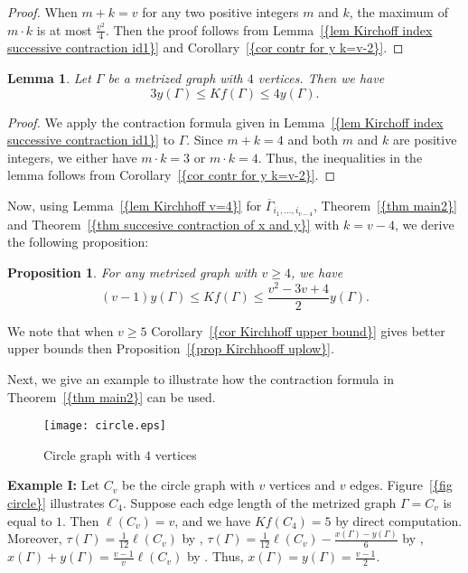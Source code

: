 \documentclass[12pt]{amsart}
\newtheorem{lemma}[theorem]{Lemma}
\newtheorem{proposition}[theorem]{Proposition}
\theoremstyle{example}
\theoremstyle{definition}
\theoremstyle{notation}
\begin{document}
\begin{proof}
When $m+k=v$ for any two positive integers $m$ and $k$, the maximum of $m \cdot k$ is at most $\frac{v^2}{4}$.
Then the proof follows from {Lemma~\ref{{lem Kirchoff index successive contraction id1}}} and {Corollary~\ref{{cor contr for y k=v-2}}}.
\end{proof}
\begin{lemma}\label{lem Kirchhoff v=4}
Let ${\Gamma}$ be a metrized graph with $4$ vertices. Then we have
$$3y({\Gamma}) \leq  Kf({\Gamma}) \leq 4  y({\Gamma}).$$
\end{lemma}
\begin{proof}
We apply the contraction formula given in {Lemma~\ref{{lem Kirchoff index successive contraction id1}}} to ${\Gamma}$.
Since $m+k=4$ and both $m$ and $k$ are positive integers, we either have $m \cdot k =3$ or $m \cdot k =4$.
Thus, the inequalities in the lemma follows from {Corollary~\ref{{cor contr for y k=v-2}}}.
\end{proof}
Now, using {Lemma~\ref{{lem Kirchhoff v=4}}} for ${{\overline{\Gamma}}}_{i_1,\dots, i_{v-4}}$, {Theorem~\ref{{thm main2}}} and {Theorem~\ref{{thm succesive contraction of x and y}}} with $k=v-4$, we derive the following proposition:
\begin{proposition}\label{prop Kirchhooff uplow}
For any metrized graph with $v \geq 4$, we have
$$ (v-1)y({\Gamma}) \leq  Kf({\Gamma}) \leq \frac{v^2-3v+4}{2}  y({\Gamma}).$$
\end{proposition}
We note that when $v \geq 5$ {Corollary~\ref{{cor Kirchhoff upper bound}}} gives better upper bounds then {Proposition~\ref{{prop Kirchhooff uplow}}}.

Next, we give an example to illustrate how the contraction formula in {Theorem~\ref{{thm main2}}} can be used.
\begin{figure}
\centering
\texttt{[image: circle.eps]} \caption{Circle graph with $4$ vertices} \label{fig circle}
\end{figure}

\textbf{Example I:} Let $C_v$ be the circle graph with $v$ vertices and $v$ edges. {Figure~\ref{{fig circle}}} illustrates $C_4$.
Suppose each edge length of the metrized graph ${\Gamma}=C_v$ is equal to $1$. Then $\ell(C_v)=v$, and we have $Kf(C_4)=5$ by direct computation. Moreover,
${\tau(\Gamma)}=\frac{1}{12}\ell(C_v)$ by \cite[Corollary 2.17]{C4}, ${\tau(\Gamma)}=\frac{1}{12}\ell(C_v)-\frac{x({\Gamma})-y({\Gamma})}{6}$ by \cite[Equation 20]{C5},
$x({\Gamma})+y({\Gamma})=\frac{v-1}{v}\ell(C_v)$ by \cite[Lemma 6.3]{C6}. Thus, $x({\Gamma})=y({\Gamma})=\frac{v-1}{2}$.
\end{document}
